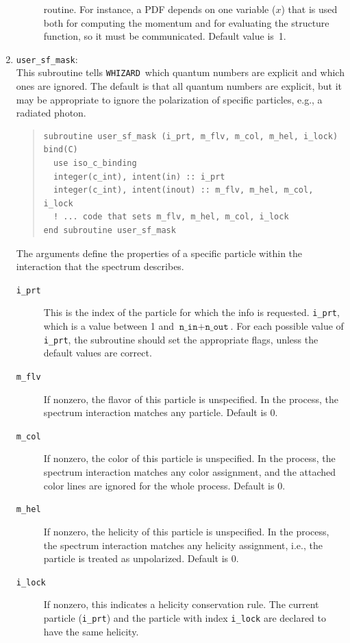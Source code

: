 \documentclass[12pt]{book}
\newcommand{\ttt}[1]{\texttt{#1}}
\newcommand{\whizard}{\texttt{WHIZARD}}
\begin{document}
\begin{enumerate}
\begin{description}
    routine.  For instance, a PDF depends on one variable ($x$) that
    is used both for computing the momentum and for evaluating the
    structure function, so it must be communicated.  Default value
    is~1.
  \end{description}
\item
  \ttt{user\_sf\_mask}:\\
  This subroutine tells \whizard\ which quantum numbers are explicit
  and which ones are ignored.  The default is that all quantum numbers
  are explicit, but it may be appropriate to ignore the polarization
  of specific particles, e.g., a radiated photon.
  \begin{quote}
  \begin{footnotesize}
\begin{verbatim}
subroutine user_sf_mask (i_prt, m_flv, m_col, m_hel, i_lock) bind(C)
  use iso_c_binding
  integer(c_int), intent(in) :: i_prt
  integer(c_int), intent(inout) :: m_flv, m_hel, m_col, i_lock
  ! ... code that sets m_flv, m_hel, m_col, i_lock
end subroutine user_sf_mask
\end{verbatim}
  \end{footnotesize}
  \end{quote}
  The arguments define the properties of a specific particle within
  the interaction that the spectrum describes.
  \begin{description}
  \item[\ttt{i\_prt}]  This is the index of the particle for which the
    info is requested.  \ttt{i\_prt}, which is a value between 1 and
    $\ttt{n\_in}+\ttt{n\_out}$.  For each possible value of
    \ttt{i\_prt}, the subroutine should set the appropriate flags,
    unless the default values are correct.  
  \item[\ttt{m\_flv}]  If nonzero, the flavor of this particle is
    unspecified.  In the process, the spectrum interaction matches any
    particle.  Default is 0.
  \item[\ttt{m\_col}]  If nonzero, the color of this particle is
    unspecified.  In the process, the spectrum interaction matches any
    color assignment, and the attached color lines are ignored for the
    whole process.  Default is 0.
  \item[\ttt{m\_hel}]  If nonzero, the helicity of this particle is
    unspecified.  In the process, the spectrum interaction matches any
    helicity assignment, i.e., the particle is treated as
    unpolarized.  Default is 0.
  \item[\ttt{i\_lock}]  If nonzero, this indicates a helicity
    conservation rule.  The current particle (\ttt{i\_prt}) and the
    particle with index \ttt{i\_lock} are declared to have the same
    helicity.


\end{description}
\end{enumerate}
\end{document}
